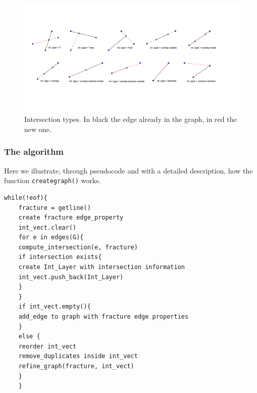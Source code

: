 \documentclass[10pt]{article} %
\begin{document}
	\begin{figure}
		\centering 
		\includegraphics[width=1\textwidth]{"int_type"}
		\caption{Intersection types. In black the edge already in the graph, in red the new one.}
		\label{fig:frac_int_type}
	\end{figure}
	\subsubsection{The algorithm}
	Here we illustrate, through pseudocode 
	and with a detailed description, how the function \texttt{create\textunderscore graph()} works.
	\begin{lstlisting}[frame=single]
	while(!eof){
	fracture = getline()
	create fracture edge_property 
	int_vect.clear()
	for e in edges(G){
	compute_intersection(e, fracture)
	if intersection exists{
	create Int_Layer with intersection information
	int_vect.push_back(Int_Layer)
	}	
	}
	if int_vect.empty(){
	add_edge to graph with fracture edge properties
	} 
	else {
	reorder int_vect
	remove_duplicates inside int_vect
	refine_graph(fracture, int_vect)  
	}
	}
	\end{lstlisting}
	
\end{document}
